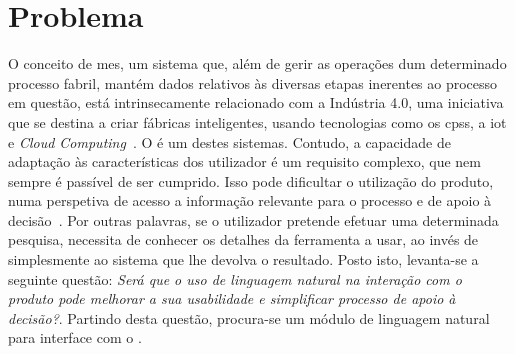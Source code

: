 \section{Problema}
\label{sec:chap01_problem}
O conceito de \gls{mes}, um sistema que, além de gerir as operações dum determinado processo fabril, mantém dados relativos às diversas etapas inerentes ao processo em questão, está intrinsecamente relacionado com a Indústria 4.0, uma iniciativa que se destina a criar fábricas inteligentes, usando tecnologias como os \glspl{cps}, a \gls{iot} e \textit{Cloud Computing}~\parencite{intelligent_manufacturing_context_industry40_review}. O {\productname} é um destes sistemas. Contudo, a capacidade de adaptação às características dos utilizador é um requisito complexo, que nem sempre é passível de ser cumprido. Isso pode dificultar o utilização do produto, numa perspetiva de acesso a informação relevante para o processo e de apoio à decisão~\parencite{intelligent_manufacturing_context_industry40_review}. Por outras palavras, se o utilizador pretende efetuar uma determinada pesquisa, necessita de conhecer os detalhes da ferramenta a usar, ao invés de simplesmente  ao sistema que lhe devolva o resultado. Posto isto, levanta-se a seguinte questão: \textit{Será que o uso de linguagem natural na interação com o produto pode melhorar a sua usabilidade e simplificar processo de apoio à decisão?}. Partindo desta questão, 
procura-se um módulo de linguagem natural para interface com o {\productname}.






